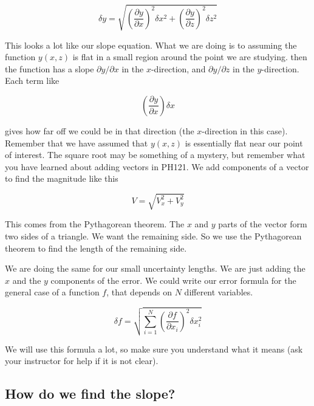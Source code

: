\begin{equation*}
	\delta y=\sqrt{\left( \frac{\partial y}{\partial x}\right) ^{2}\delta x^{2}+\left( \frac{\partial y}{\partial z}\right) ^{2}\delta z^{2}}
\end{equation*}

This looks a lot like our slope equation. What we are doing is to assuming the function $y\left( x,z\right) $ is flat in a small region around the point we are studying. then the function has a slope $\partial y/\partial x$ in the $x$-direction, and $\partial y/\partial z$ in the $y$-direction. Each term like 

\begin{equation*}
	\left( \frac{\partial y}{\partial x}\right) \delta x
\end{equation*}

gives how far off we could be in that direction (the $x$-direction in this case). Remember that we have assumed that $y\left( x,z\right) $ is essentially flat near our point of interest. The square root may be something of a mystery, but remember what you have learned about adding vectors in PH121. We add components of a vector to find the magnitude like this
 
\begin{equation*}
	V=\sqrt{V_{x}^{2}+V_{y}^{2}}
\end{equation*}

This comes from the Pythagorean theorem. The $x$ and $y$ parts of the vector form two sides of a triangle. We want the remaining side. So we use the Pythagorean theorem to find the length of the remaining side.

We are doing the same for our small uncertainty lengths. We are just adding the $x$ and the $y$ components of the error. We could write our error formula for the general case of a function $f$, that depends on $N$ different variables. 

\begin{equation*}
	\delta f=\sqrt{\sum_{i=1}^{N}\left( \frac{\partial f}{\partial x_{i}}\right)^{2}\delta x_{i}^{2}}
\end{equation*}

We will use this formula a lot, so make sure you understand what it means (ask your instructor for help if it is not clear).

\subsection{How do we find the slope?}


